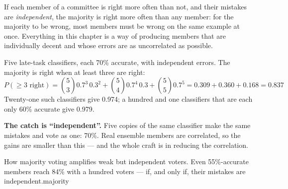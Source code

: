 \begin{conceptbox}
If each member of a committee is right more often than not, and their mistakes are
\emph{independent}, the majority is right more often than any member: for the
majority to be wrong, most members must be wrong on the same example at once.
Everything in this chapter is a way of producing members that are individually
decent and whose errors are as uncorrelated as possible.
\end{conceptbox}

\begin{worked}
Five late-task classifiers, each 70\% accurate, with independent errors. The
majority is right when at least three are right:
\[
P(\ge 3 \text{ right}) = \binom{5}{3}0.7^3\,0.3^2 + \binom{5}{4}0.7^4\,0.3 + \binom{5}{5}0.7^5
= 0.309 + 0.360 + 0.168 = \mathbf{0.837}
\]
Twenty-one such classifiers give 0.974; a hundred and one classifiers that are each
only 60\% accurate give 0.979.

\smallskip
\textbf{The catch is ``independent''.} Five copies of the same classifier make the
same mistakes and vote as one: 70\%. Real ensemble members are correlated, so the
gains are smaller than this --- and the whole craft is in reducing the correlation.
\end{worked}

%
{How majority voting amplifies weak but independent voters. Even 55\%-accurate members
reach 84\% with a hundred voters --- if, and only if, their mistakes are
independent.}{majority}

